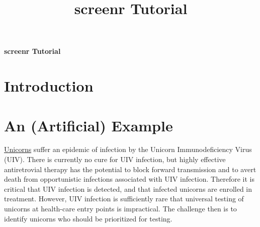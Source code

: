 \documentclass[11pt]{report}
\title{\textsf{\textbf{screenr Tutorial}}}
\begin{document}
\begin{center}
  \Huge{\textbf{screenr Tutorial}} \\
  \vspace{1em}
\end{center}

\section*{Introduction}




\section*{An (Artificial) Example}

\href{https://www.britannica.com/topic/unicorn}{Unicorns} suffer an
epidemic of infection by the Unicorn Immunodeficiency Virus (UIV).
There is currently no cure for UIV infection, but highly effective
antiretrovial therapy has the potential to block forward
transmission and to avert death from opportunistic infections
associated with UIV infection.  Therefore it is critical
that UIV infection is detected, and that infected unicorns are
enrolled in treatment.  However, UIV infection is sufficiently rare
that universal testing of unicorns at health-care entry points is
impractical.  The challenge then is to identify
unicorns who should be prioritized for testing.
\end{document}
